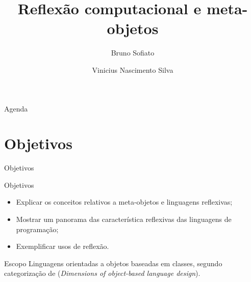 \documentclass[12pt,t]{beamer}
\institute{POO 2015\\IME -- USP}
\author[Bruno e Vinicius]{Bruno Sofiato \and Vinicius Nascimento Silva}
\title{Reflexão computacional e meta-objetos}
\begin{document}
\abovedisplayskip=0pt
\abovedisplayshortskip=0pt
\belowdisplayskip=0pt
\belowdisplayshortskip=0pt	
 \frame{\titlepage}
 \begin{frame}{Agenda}
	\tableofcontents
 \end{frame}
 \section{Objetivos}
 \begin{frame}{Objetivos}
 	\begin{block}{Objetivos}
 		\begin{itemize}
 			\item Explicar os conceitos relativos a meta-objetos e linguagens reflexivas;
 			\pause
 			\item Mostrar um panorama das característica reflexivas das linguagens de programação;
 			\pause
 			\item Exemplificar usos de reflexão.
 		\end{itemize}
 	\end{block}
 	\pause
 	\begin{block}{Escopo}
 		Linguagens orientadas a objetos baseadas em classes, segundo categorização de  (\emph{Dimensions of object-based language design}).
 	\end{block}
 \end{frame}
\end{document}
